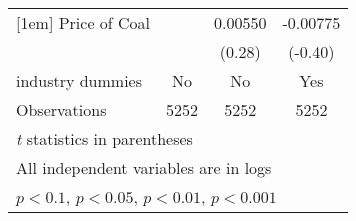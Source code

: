 \begin{table}[htbp]
\begin{tabular}{l*{3}{c}}
[1em]
Price of Coal       &                     &     0.00550         &    -0.00775         \\
                    &                     &      (0.28)         &     (-0.40)         \\
[1em]
industry dummies    &          No         &          No         &         Yes         \\
\hline
Observations        &        5252         &        5252         &        5252         \\
\hline\hline
\multicolumn{4}{l}{\footnotesize \textit{t} statistics in parentheses}\\
\multicolumn{4}{l}{\footnotesize All independent variables are in logs}\\
\multicolumn{4}{l}{\footnotesize \sym{+} \(p<0.1\), \sym{*} \(p<0.05\), \sym{**} \(p<0.01\), \sym{***} \(p<0.001\)}\\
\end{tabular}
\end{table}

